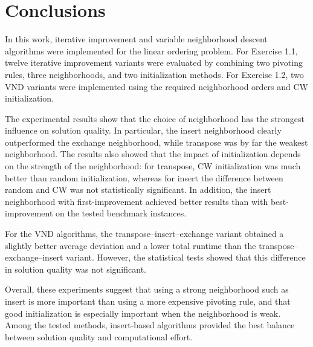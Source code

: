 \section{Conclusions}\label{sec:conclusions}

In this work, iterative improvement and variable neighborhood descent algorithms were implemented for the linear ordering problem. For Exercise 1.1, twelve iterative improvement variants were evaluated by combining two pivoting rules, three neighborhoods, and two initialization methods. For Exercise 1.2, two VND variants were implemented using the required neighborhood orders and CW initialization.

The experimental results show that the choice of neighborhood has the strongest influence on solution quality. In particular, the insert neighborhood clearly outperformed the exchange neighborhood, while transpose was by far the weakest neighborhood. The results also showed that the impact of initialization depends on the strength of the neighborhood: for transpose, CW initialization was much better than random initialization, whereas for insert the difference between random and CW was not statistically significant. In addition, the insert neighborhood with first-improvement achieved better results than with best-improvement on the tested benchmark instances.

For the VND algorithms, the transpose--insert--exchange variant obtained a slightly better average deviation and a lower total runtime than the transpose--exchange--insert variant. However, the statistical tests showed that this difference in solution quality was not significant.

Overall, these experiments suggest that using a strong neighborhood such as insert is more important than using a more expensive pivoting rule, and that good initialization is especially important when the neighborhood is weak. Among the tested methods, insert-based algorithms provided the best balance between solution quality and computational effort.